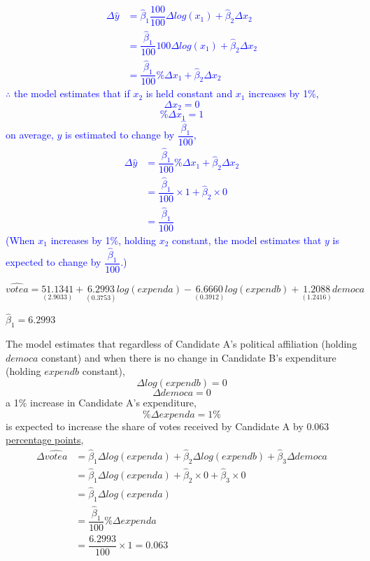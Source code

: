 \documentclass[12pt]{report}
\newenvironment{blueframed}[1][blue]
{\def\FrameCommand{\fboxsep=\FrameSep\fcolorbox{#1}{white}}%
	\MakeFramed {\advance\hsize-\width \FrameRestore}}
{\endMakeFramed}
\begin{document}
\justify
\begin{blueframed}
	\vspace{-\baselineskip}
	\justify
	\noindent \textcolor{blue}
	{
		\begin{align*}
			\Delta \hat{y} &= \hat{\beta}_1\dfrac{100}{100}\Delta log(x_1) + \hat{\beta}_2\Delta x_2 \\
			&= \dfrac{\hat{\beta}_1}{100} 100\Delta log(x_1) + \hat{\beta}_2\Delta x_2 \\
			&= \dfrac{\hat{\beta}_1}{100} \%\Delta x_1 + \hat{\beta}_2\Delta x_2
		\end{align*}
		$\therefore$ the model estimates that if $x_2$ is held constant and $x_1$ increases by 1\%, $$\Delta x_2 = 0$$ $$\% \Delta x_1 = 1$$ on average, $y$ is estimated to change by $\dfrac{\hat{\beta}_1}{100}$, \begin{align*}
			\Delta \hat{y} &= \dfrac{\hat{\beta}_1}{100} \%\Delta x_1 + \hat{\beta}_2\Delta x_2 \\
			&= \dfrac{\hat{\beta}_1}{100} \times 1 + \hat{\beta}_2 \times 0 \\
			&= \dfrac{\hat{\beta}_1}{100}
		\end{align*} (When $x_1$ increases by 1\%, holding $x_2$ constant, the model estimates that $y$ is expected to change by $\dfrac{\hat{\beta}_1}{100}$.)
	}
\end{blueframed}
\begin{figure}[H]
\end{figure}
\vspace{-\baselineskip}

\newpage
$$\widehat{votea} = \underset{(2.9033)}{51.1341} + \underset{(0.3753)}{6.2993}log(expenda) - \underset{(0.3912)}{6.6660}log(expendb) + \underset{(1.2416)}{1.2088}democa$$

\noindent $\hat{\beta}_1 = 6.2993$

\noindent The model estimates that regardless of Candidate A’s political affiliation (holding $democa$ constant) and when there is no change in Candidate B’s expenditure (holding $expendb$ constant), $$\Delta log(expendb) = 0$$ $$\Delta democa = 0$$ a 1\% increase in Candidate A’s expenditure,
$$\%{\Delta}expenda = 1\%$$ is expected to increase the share of votes received by Candidate A  by 0.063 \uline{percentage points},
\begin{align*}
	\Delta \widehat{votea} &= \hat{\beta}_1\Delta log(expenda) + \hat{\beta}_2\Delta log(expendb) + \hat{\beta}_3\Delta democa \\
	&= \hat{\beta}_1\Delta log(expenda) + \hat{\beta}_2\times 0 + \hat{\beta}_3\times 0 \\
	&= \hat{\beta}_1\Delta log(expenda) \\
	&= \dfrac{\hat{\beta}_1}{100}\%{\Delta}expenda \\
	&= \dfrac{6.2993}{100}\times1=0.063
\end{align*}
\end{document}
